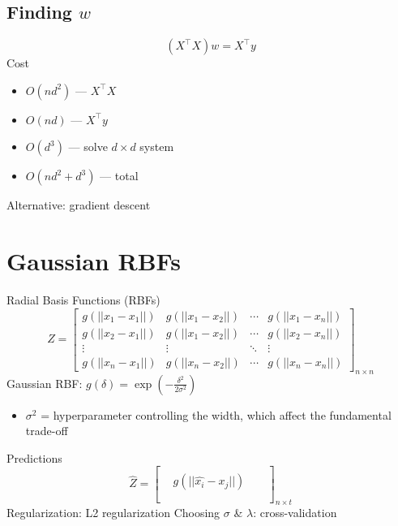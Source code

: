 \documentclass[10pt,landscape,a4paper]{article}
\begin{document}
\begin{multicols*}{5}
\subsection{Finding \(w\)}
\begin{dmath*}
    (X^\intercal X) w = X^\intercal y
\end{dmath*}
Cost
\begin{itemize}
    \item \(O(nd^2)\) --- \(X^\intercal X\)
    \item \(O(nd)\) --- \(X^\intercal y\)
    \item \(O(d^3)\) --- solve \(d \times d\) system
    \item \(O(nd^2 + d^3)\) --- total
\end{itemize}
Alternative: gradient descent


\section{Gaussian RBFs}
Radial Basis Functions (RBFs)
\begin{dmath*}
    Z =
    \begin{bmatrix}
        g(||x_1-x_1||) & g(||x_1-x_2||) & \cdots & g(||x_1-x_n||) \\
        g(||x_2-x_1||) & g(||x_1-x_2||) & \cdots & g(||x_2-x_n||) \\
        \vdots & \vdots & \ddots & \vdots \\
        g(||x_n-x_1||) & g(||x_n-x_2||) & \cdots & g(||x_n-x_n||)
    \end{bmatrix}_{n \times n}
\end{dmath*}
Gaussian RBF: \(g(\delta) = \exp(-\frac{\delta^2}{2\sigma^2})\)
\begin{itemize}
    \item \(\sigma^2\) = hyperparameter controlling the width, which affect the fundamental trade-off
\end{itemize}
Predictions
\begin{dmath*}
    \hat{Z} =
    \begin{bmatrix}
        &  &  & \\
    & g(||\hat{x_i}-x_j||) &  &  \\
        &  &  &  \\
    &  &  &
\end{bmatrix}_{n \times t}
\end{dmath*}
Regularization: L2 regularization
Choosing \(\sigma \) \& \(\lambda \): cross-validation


\end{multicols*}
\end{document}
